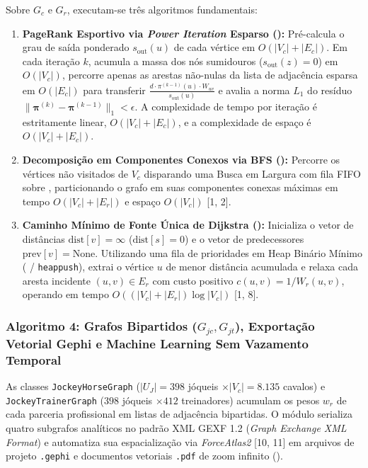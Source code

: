 \documentclass[conference]{IEEEtran}
\begin{document}
Sobre $G_c$ e $G_r$, executam-se três algoritmos fundamentais:
\begin{enumerate}
    \item \textbf{PageRank Esportivo via \textit{Power Iteration} Esparso ():} Pré-calcula o grau de saída ponderado $s_{\text{out}}(u)$ de cada vértice em $O(|V_c| + |E_c|)$. Em cada iteração $k$, acumula a massa dos nós sumidouros ($s_{\text{out}}(z) = 0$) em $O(|V_c|)$, percorre apenas as arestas não-nulas da lista de adjacência esparsa  em $O(|E_c|)$ para transferir $\frac{d \cdot \pi^{(k-1)}(u) \cdot W_{uv}}{s_{\text{out}}(u)}$ e avalia a norma $L_1$ do resíduo $\|\boldsymbol{\pi}^{(k)} - \boldsymbol{\pi}^{(k-1)}\|_1 < \epsilon$. A complexidade de tempo por iteração é estritamente linear, $O(|V_c| + |E_c|)$, e a complexidade de espaço é $O(|V_c| + |E_c|)$.
    \item \textbf{Decomposição em Componentes Conexos via BFS ():} Percorre os vértices não visitados de $V_c$ disparando uma Busca em Largura com fila FIFO sobre , particionando o grafo em suas componentes conexas máximas em tempo $O(|V_c| + |E_r|)$ e espaço $O(|V_c|)$ [1, 2].
    \item \textbf{Caminho Mínimo de Fonte Única de Dijkstra ():} Inicializa o vetor de distâncias $\text{dist}[v] = \infty$ ($\text{dist}[s] = 0$) e o vetor de predecessores $\text{prev}[v] = \text{None}$. Utilizando uma fila de prioridades em Heap Binário Mínimo ( / \texttt{heappush}), extrai o vértice $u$ de menor distância acumulada e relaxa cada aresta incidente $(u, v) \in E_r$ com custo positivo $c(u, v) = 1 / W_r(u, v)$, operando em tempo $O((|V_c| + |E_r|) \log |V_c|)$ [1, 8].
\end{enumerate}

\subsubsection{Algoritmo 4: Grafos Bipartidos ($G_{jc}, G_{jt}$), Exportação Vetorial Gephi e Machine Learning Sem Vazamento Temporal}
As classes \texttt{JockeyHorseGraph} ($|U_J| = 398$ jóqueis $\times |V_c| = 8.135$ cavalos) e \texttt{JockeyTrainerGraph} ($398$ jóqueis $\times 412$ treinadores) acumulam os pesos $w_r$ de cada parceria profissional em listas de adjacência bipartidas. O módulo  serializa quatro subgrafos analíticos no padrão XML GEXF 1.2 (\textit{Graph Exchange XML Format}) e automatiza sua espacialização via \textit{ForceAtlas2} [10, 11] em arquivos de projeto \texttt{.gephi} e documentos vetoriais \texttt{.pdf} de zoom infinito ().
\end{document}
